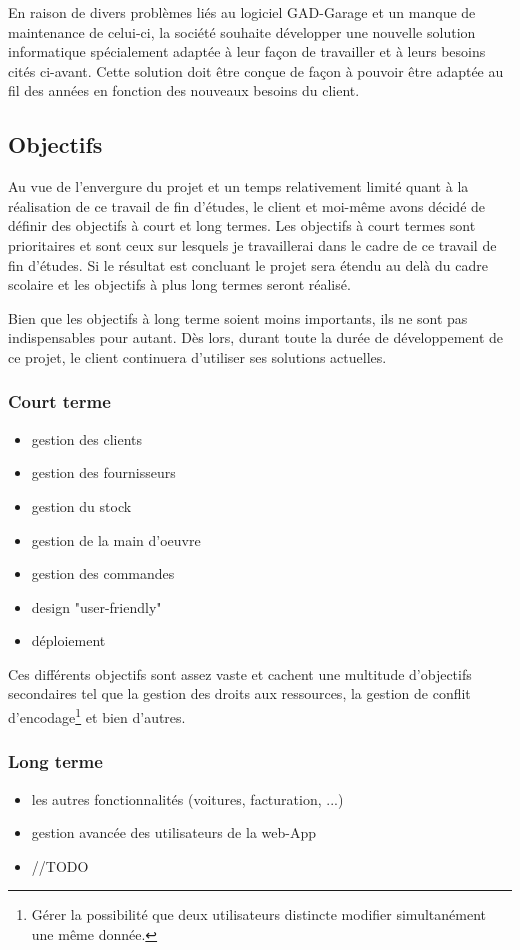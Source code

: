 \newpara

En raison de divers problèmes liés au logiciel GAD-Garage et un manque de maintenance de celui-ci, la société souhaite développer une nouvelle solution informatique spécialement adaptée à leur façon de travailler et à leurs besoins cités ci-avant. Cette solution doit être conçue de façon à pouvoir être adaptée au fil des années en fonction des nouveaux besoins du client.

\newpage

\subsection{Objectifs}

Au vue de l'envergure du projet et un temps relativement limité quant à la réalisation de ce travail de fin d'études, le client et moi-même avons décidé de définir des objectifs à court et long termes. Les objectifs à court termes sont prioritaires et sont ceux sur lesquels je travaillerai dans le cadre de ce travail de fin d'études. Si le résultat est concluant le projet sera étendu au delà du cadre scolaire et les objectifs à plus long termes seront réalisé. 

\newpara

Bien que les objectifs à long terme soient moins importants, ils ne sont pas indispensables pour autant. Dès lors, durant toute la durée de développement de ce projet, le client continuera d'utiliser ses solutions actuelles. 

\subsubsection{Court terme}

\begin{itemize}
  \item gestion des clients 
  \item gestion des fournisseurs
  \item gestion du stock
  \item gestion de la main d'oeuvre
  \item gestion des commandes 
  \item design "user-friendly"
  \item déploiement
\end{itemize}

\newpara

Ces différents objectifs sont assez vaste et cachent une multitude d'objectifs secondaires tel que la gestion des droits aux ressources, la gestion de conflit d'encodage\footnote{Gérer la possibilité que deux utilisateurs distincte modifier simultanément une même donnée.} et bien d'autres.  

\subsubsection{Long terme}

\begin{itemize}
  \item les autres fonctionnalités (voitures, facturation, ...)
  \item gestion avancée des utilisateurs de la web-App
  \item //TODO
\end{itemize}
